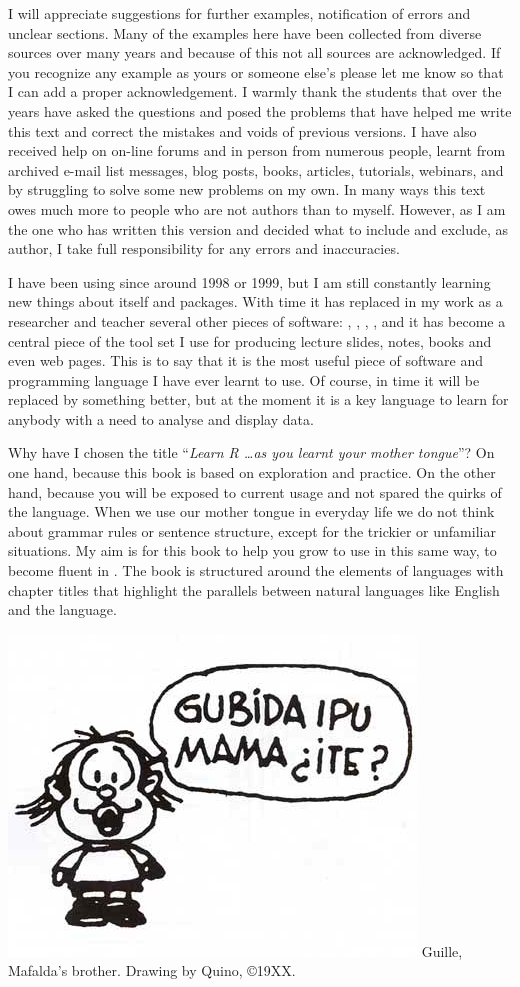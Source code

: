 I will appreciate suggestions for further examples, notification of errors and unclear sections. Many of the examples here have been collected from diverse sources over many years and because of this not all sources are acknowledged. If you recognize any example as yours or someone else's please let me know so that I can add a proper acknowledgement. I warmly thank the students that over the years have asked the questions and posed the problems that have helped me write this text and correct the mistakes and voids of previous versions. I have also received help on on-line forums and in person from numerous people, learnt from archived e-mail list messages, blog posts, books, articles, tutorials, webinars, and by struggling to solve some new problems on my own. In many ways this text owes much more to people who are not authors than to myself. However, as I am the one who has written this version and decided what to include and exclude, as author, I take full responsibility for any errors and inaccuracies.

I have been using \Rlang since around 1998 or 1999, but I am still constantly learning new things about \Rlang itself and \Rlang packages. With time it has replaced in my work as a researcher and teacher several other pieces of software: , , , , and it has become a central piece of the tool set I use for producing lecture slides, notes, books and even web pages. This is to say that it is the most useful piece of software and programming language I have ever learnt to use. Of course, in time it will be replaced by something better, but at the moment it is a key language to learn for anybody with a need to analyse and display data.

Why have I chosen the title ``\emph{Learn R \ldots as you learnt your mother tongue}''? On one hand, because this book is based on exploration and practice. On the other hand, because you will be exposed to current usage and not spared the quirks of the language. When we use our mother tongue in everyday life we do not think about grammar rules or sentence structure, except for the trickier or unfamiliar situations. My aim is for this book to help you grow to use \Rlang in this same way, to become fluent in \Rlang. The book is structured around the elements of languages with chapter titles that highlight the parallels between natural languages like English and the \Rlang language.

\begin{center}
\includegraphics[width=0.3\linewidth]{figures/guille}
Guille, Mafalda's brother. Drawing by Quino, \copyright 19XX.
\end{center}

